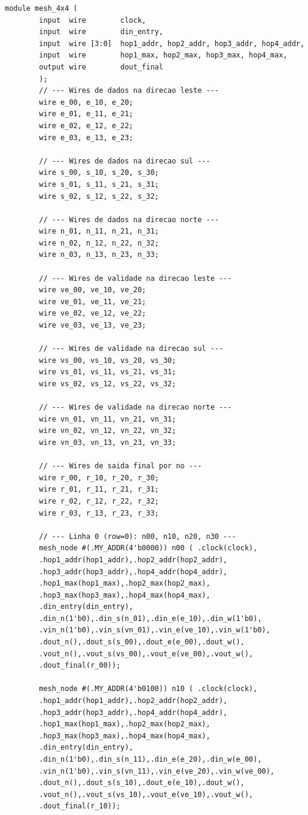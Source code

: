 \documentclass[12pt, a4paper]{article}
\begin{document}
	\begin{lstlisting}[style=verilog, caption={\texttt{mesh\_4x4.v} --- Estrutura de interligação dos 16 nós da rede \textit{mesh} 4$\times$4, com fiação completa de dados e sinais de validade.}, label={lst:mesh4x4}]
		module mesh_4x4 (
		input  wire        clock,
		input  wire        din_entry,
		input  wire [3:0]  hop1_addr, hop2_addr, hop3_addr, hop4_addr,
		input  wire        hop1_max, hop2_max, hop3_max, hop4_max,
		output wire        dout_final
		);
		// --- Wires de dados na direcao leste ---
		wire e_00, e_10, e_20;
		wire e_01, e_11, e_21;
		wire e_02, e_12, e_22;
		wire e_03, e_13, e_23;
		
		// --- Wires de dados na direcao sul ---
		wire s_00, s_10, s_20, s_30;
		wire s_01, s_11, s_21, s_31;
		wire s_02, s_12, s_22, s_32;
		
		// --- Wires de dados na direcao norte ---
		wire n_01, n_11, n_21, n_31;
		wire n_02, n_12, n_22, n_32;
		wire n_03, n_13, n_23, n_33;
		
		// --- Wires de validade na direcao leste ---
		wire ve_00, ve_10, ve_20;
		wire ve_01, ve_11, ve_21;
		wire ve_02, ve_12, ve_22;
		wire ve_03, ve_13, ve_23;
		
		// --- Wires de validade na direcao sul ---
		wire vs_00, vs_10, vs_20, vs_30;
		wire vs_01, vs_11, vs_21, vs_31;
		wire vs_02, vs_12, vs_22, vs_32;
		
		// --- Wires de validade na direcao norte ---
		wire vn_01, vn_11, vn_21, vn_31;
		wire vn_02, vn_12, vn_22, vn_32;
		wire vn_03, vn_13, vn_23, vn_33;
		
		// --- Wires de saida final por no ---
		wire r_00, r_10, r_20, r_30;
		wire r_01, r_11, r_21, r_31;
		wire r_02, r_12, r_22, r_32;
		wire r_03, r_13, r_23, r_33;
		
		// --- Linha 0 (row=0): n00, n10, n20, n30 ---
		mesh_node #(.MY_ADDR(4'b0000)) n00 ( .clock(clock),
		.hop1_addr(hop1_addr),.hop2_addr(hop2_addr),
		.hop3_addr(hop3_addr),.hop4_addr(hop4_addr),
		.hop1_max(hop1_max),.hop2_max(hop2_max),
		.hop3_max(hop3_max),.hop4_max(hop4_max),
		.din_entry(din_entry),
		.din_n(1'b0),.din_s(n_01),.din_e(e_10),.din_w(1'b0),
		.vin_n(1'b0),.vin_s(vn_01),.vin_e(ve_10),.vin_w(1'b0),
		.dout_n(),.dout_s(s_00),.dout_e(e_00),.dout_w(),
		.vout_n(),.vout_s(vs_00),.vout_e(ve_00),.vout_w(),
		.dout_final(r_00));
		
		mesh_node #(.MY_ADDR(4'b0100)) n10 ( .clock(clock),
		.hop1_addr(hop1_addr),.hop2_addr(hop2_addr),
		.hop3_addr(hop3_addr),.hop4_addr(hop4_addr),
		.hop1_max(hop1_max),.hop2_max(hop2_max),
		.hop3_max(hop3_max),.hop4_max(hop4_max),
		.din_entry(din_entry),
		.din_n(1'b0),.din_s(n_11),.din_e(e_20),.din_w(e_00),
		.vin_n(1'b0),.vin_s(vn_11),.vin_e(ve_20),.vin_w(ve_00),
		.dout_n(),.dout_s(s_10),.dout_e(e_10),.dout_w(),
		.vout_n(),.vout_s(vs_10),.vout_e(ve_10),.vout_w(),
		.dout_final(r_10));
		

\end{lstlisting}
\end{document}
